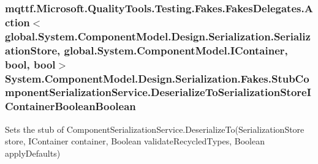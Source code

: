 \hypertarget{class_system_1_1_component_model_1_1_design_1_1_serialization_1_1_fakes_1_1_stub_component_serialization_service_af0a424d1d4ac4e7e39a7e05f537acd01}{
\subsubsection[{Deserialize\-To\-Serialization\-Store\-I\-Container\-Boolean\-Boolean}]{\setlength{\rightskip}{0pt plus 5cm}mqttf.\-Microsoft.\-Quality\-Tools.\-Testing.\-Fakes.\-Fakes\-Delegates.\-Action$<$global.\-System.\-Component\-Model.\-Design.\-Serialization.\-Serialization\-Store, global.\-System.\-Component\-Model.\-I\-Container, bool, bool$>$ System.\-Component\-Model.\-Design.\-Serialization.\-Fakes.\-Stub\-Component\-Serialization\-Service.\-Deserialize\-To\-Serialization\-Store\-I\-Container\-Boolean\-Boolean}}\label{class_system_1_1_component_model_1_1_design_1_1_serialization_1_1_fakes_1_1_stub_component_serialization_service_af0a424d1d4ac4e7e39a7e05f537acd01}


Sets the stub of Component\-Serialization\-Service.\-Deserialize\-To(\-Serialization\-Store store, I\-Container container, Boolean validate\-Recycled\-Types, Boolean apply\-Defaults)

